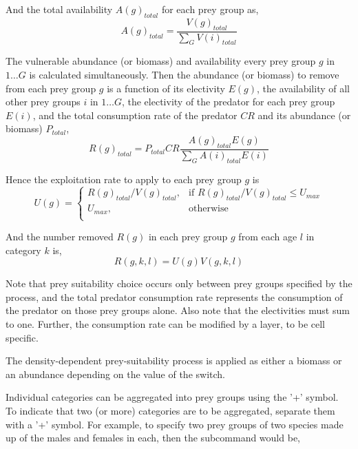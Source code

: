 And the total availability $A(g)_{total}$ for each prey group as,
\begin{equation}
A(g)_{total} = \frac{V(g)_{total}}{\sum\limits_G {V(i)_{total}}}
\end{equation}

The vulnerable abundance (or biomass) and availability every prey group $g$ in $1 \ldots G$ is calculated simultaneously. Then the abundance (or biomass) to remove from each prey group $g$ is a function of its electivity $E(g)$, the availability of all other prey groups $i$ in $1 \ldots G$, the electivity of the predator for each prey group $E(i)$, and the total consumption rate of the predator $CR$ and its abundance (or biomass) $P_{total}$,
\begin{equation}
R(g)_{total}=P_{total} CR \frac{A(g)_{total} E(g)}{\sum\limits_G {A(i)_{total} E(i)}}
\end{equation}

Hence the exploitation rate to apply to each prey group $g$ is 
\begin{equation}
U(g) = \begin{cases}
R(g)_{total}/V(g)_{total}, & \text{if $R(g)_{total}/V(g)_{total} \leq U_{max}$} \\
U_{max}, & \text{otherwise}\\ 
\end{cases} 
\end{equation}

And the number removed $R(g)$ in each prey group $g$ from each age $l$ in category $k$ is,
\begin{equation}
R(g,k,l) = U(g)V(g,k,l)
\end{equation}

Note that prey suitability choice occurs only between prey groups specified by the process, and the total predator consumption rate represents the consumption of the predator on those prey groups alone. Also note that the electivities must sum to one. Further, the consumption rate can be modified by a layer, to be cell specific. 

The density-dependent prey-suitability process is applied as either a biomass or an abundance depending on the value of the  switch.

Individual categories can be aggregated into prey groups using the '+' symbol. To indicate that two (or more) categories are to be aggregated, separate them with a '+' symbol. For example, to specify two prey groups of two species made up of the males and females in each, then the subcommand would be,

